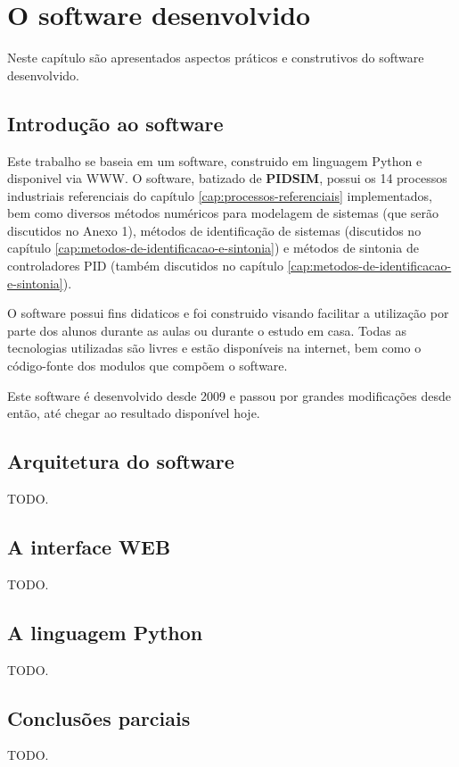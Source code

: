 \chapter{O software desenvolvido \label{cap:software}}

Neste capítulo são apresentados aspectos práticos e construtivos do
software desenvolvido.

\section{Introdução ao software}

    Este trabalho se baseia em um software, construido em linguagem Python
    e disponivel via \ac{WWW}. O software, batizado de \textbf{PIDSIM},
    possui os 14 processos industriais referenciais do capítulo
    \ref{cap:processos-referenciais} implementados, bem como diversos
    métodos numéricos para modelagem de sistemas (que serão discutidos no
    Anexo 1), métodos de identificação de sistemas (discutidos no capítulo
    \ref{cap:metodos-de-identificacao-e-sintonia}) e métodos de sintonia de
    controladores \acs{PID} (também discutidos no capítulo
    \ref{cap:metodos-de-identificacao-e-sintonia}).

    O software possui fins didaticos e foi construido visando facilitar a
    utilização por parte dos alunos durante as aulas ou durante o estudo em casa.
    Todas as tecnologias utilizadas são livres e estão disponíveis na internet,
    bem como o código-fonte dos modulos que compõem o software.

    Este software é desenvolvido desde 2009 e passou por grandes modificações
    desde então, até chegar ao resultado disponível hoje.

\section{Arquitetura do software}

    TODO.

\section{A interface WEB}

    TODO.

\section{A linguagem Python}

    TODO.

\section{Conclusões parciais}

    TODO.
